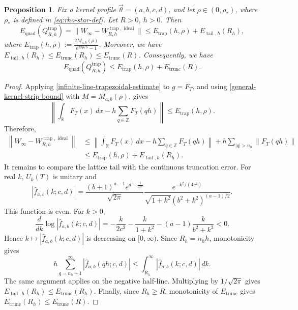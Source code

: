 \documentclass[10pt,reqno]{article}
\numberwithin{equation}{section}
\theoremstyle{plain}
\newtheorem{prop}[thm]{Proposition}
\theoremstyle{definition}
\begin{document}
\begin{prop}\label{uniform-lattice-quadrature}
Fix a kernel profile \(\vec{\theta}=(a,b,c,d)\), and let \(\rho\in(0,\rho_\ast)\), where \(\rho_\ast\) is defined in \cref{eq:rho-star-def}. Let \(R>0\), \(h>0\). Then
\begin{equation}\label{eq:uniform-lattice-error}
E_{\operatorname{quad}}(Q_{R,h}^{\operatorname{trap}}) = \|W_\infty-W_{R,h}^{\operatorname{trap},\operatorname{ideal}}\| \le E_{\operatorname{trap}}(h,\rho)+E_{\operatorname{tail},h}(R_h),
\end{equation}
where \(E_{\operatorname{trap}}(h,\rho):=\frac{2M_{a,b}(\rho)}{e^{2\pi \rho/h}-1}\). Moreover, we have $E_{\operatorname{tail},h}(R_h)\le E_{\operatorname{trunc}}(R_h)\le E_{\operatorname{trunc}}(R)$. 
Consequently, we have
\begin{equation}\label{eq:uniform-lattice-error-simple}
E_{\operatorname{quad}}(Q_{R,h}^{\operatorname{trap}})\le E_{\operatorname{trap}}(h,\rho)+E_{\operatorname{trunc}}(R).
\end{equation}
\end{prop}

\begin{proof}
Applying \cref{infinite-line-trapezoidal-estimate} to \(g=F_T\), and using \cref{general-kernel-strip-bound} with \(M=M_{a,b}(\rho)\), gives
\begin{equation}
\left\|\int_{\mathbb R}F_T(x)\,dx-h\sum_{q\in\mathbb Z}F_T(qh)\right\|\le E_{\operatorname{trap}}(h,\rho).
\end{equation}
Therefore,
\begin{align}
\left\|W_\infty-W_{R,h}^{\operatorname{trap},\operatorname{ideal}}\right\| &\le \left\|\int_{\mathbb R}F_T(x)\,dx-h\sum_{q\in\mathbb Z}F_T(qh)\right\|+h\sum_{|q|>n_h}\|F_T(qh)\| \\
&\le E_{\operatorname{trap}}(h,\rho)+E_{\operatorname{tail},h}(R_h).
\end{align}
It remains to compare the lattice tail with the continuous truncation error. For real \(k\), \(U_k(T)\) is unitary and
\begin{equation}\label{eq:real-kernel-modulus}
|\hat f_{a,b}(k;c,d)| = \frac{(b+1)^{a-1}e^{d-\frac{1}{4c^2}}}{\sqrt{2\pi}}\frac{e^{-k^2/(4c^2)}}{\sqrt{1+k^2}(b^2+k^2)^{(a-1)/2}}.
\end{equation}
This function is even. For \(k>0\),
\begin{equation}
\frac{d}{dk}\log|\hat f_{a,b}(k;c,d)| = -\frac{k}{2c^2}-\frac{k}{1+k^2}-(a-1)\frac{k}{b^2+k^2}<0.
\end{equation}
Hence \(k\mapsto|\hat f_{a,b}(k;c,d)|\) is decreasing on \([0,\infty)\). Since \(R_h=n_hh\), monotonicity gives
\begin{equation}
h\sum_{q=n_h+1}^{\infty}|\hat f_{a,b}(qh;c,d)| \le \int_{R_h}^{\infty}|\hat f_{a,b}(k;c,d)|\,dk.
\end{equation}
The same argument applies on the negative half-line. Multiplying by \(1/\sqrt{2\pi}\) gives \(E_{\operatorname{tail},h}(R_h)\le E_{\operatorname{trunc}}(R_h)\). Finally, since \(R_h\ge R\), monotonicity of \(E_{\operatorname{trunc}}\) gives \(E_{\operatorname{trunc}}(R_h)\le E_{\operatorname{trunc}}(R)\).
\end{proof}
\end{document}
